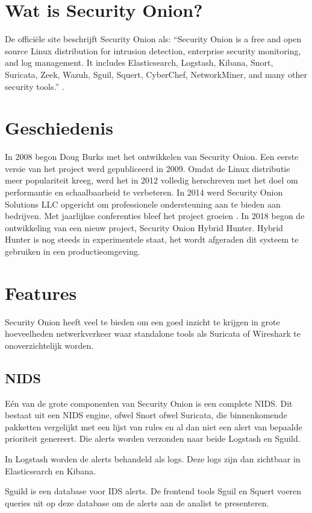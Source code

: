 \documentclass[a4paper,12pt]{report}
\begin{document}
\section{Wat is Security Onion?}
De officiële site beschrijft Security Onion als:
``Security Onion is a free and open source Linux distribution for intrusion detection, enterprise security monitoring, and log management.
It includes Elasticsearch, Logstash, Kibana, Snort, Suricata, Zeek, Wazuh, Sguil, Squert, CyberChef, NetworkMiner, and many other security tools.'' \autocite{so:docs}.

\section{Geschiedenis}
In 2008 begon Doug Burks met het ontwikkelen van Security Onion.
Een eerste versie van het project werd gepubliceerd in 2009.
Omdat de Linux distributie meer populariteit kreeg, werd het in 2012 volledig herschreven met het doel om performantie en schaalbaarheid te verbeteren.
In 2014 werd Security Onion Solutions LLC opgericht om professionele ondersteuning aan te bieden aan bedrijven.
Met jaarlijkse conferenties bleef het project groeien \autocite{so:sos}.
In 2018 begon de ontwikkeling van een nieuw project, Security Onion Hybrid Hunter.
Hybrid Hunter is nog steeds in experimentele staat, het wordt afgeraden dit systeem te gebruiken in een productieomgeving.

\section{Features}
Security Onion heeft veel te bieden om een goed inzicht te krijgen in grote hoeveelheden netwerkverkeer waar standalone tools als Suricata of Wireshark te onoverzichtelijk worden.

\subsection{NIDS}
Eén van de grote componenten van Security Onion is een complete NIDS.
Dit bestaat uit een NIDS engine, ofwel Snort ofwel Suricata, die binnenkomende pakketten vergelijkt met een lijst van rules en al dan niet een alert van bepaalde prioriteit genereert.
Die alerts worden verzonden naar beide Logstash en Sguild.

In Logstash worden de alerts behandeld als logs.
Deze logs zijn dan zichtbaar in Elasticsearch en Kibana.

Sguild is een database voor IDS alerts.
De frontend tools Sguil en Squert voeren queries uit op deze database om de alerts aan de analist te presenteren.
\end{document}
